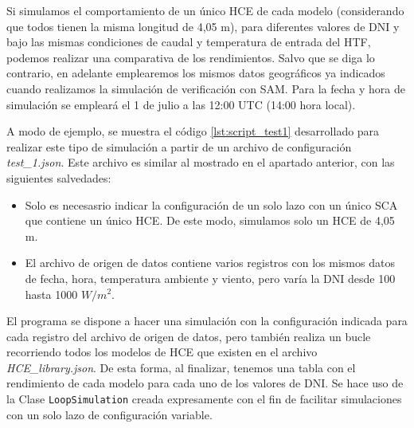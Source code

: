 Si simulamos el comportamiento de un único HCE de cada modelo (considerando que todos tienen la misma longitud de 4,05 m),  para  diferentes valores de DNI y bajo las mismas condiciones de caudal y temperatura de entrada del HTF, podemos realizar una comparativa de los rendimientos. Salvo que se diga lo contrario, en adelante emplearemos los mismos datos geográficos ya indicados cuando realizamos la simulación de verificación con SAM. Para la fecha y hora de simulación se empleará el 1 de julio a las 12:00 UTC (14:00 hora local).

A modo de ejemplo, se muestra el código  \ref{lst:script_test1} desarrollado para realizar este tipo de simulación a partir de un archivo de configuración \emph{test\_1.json}.  Este archivo es similar al mostrado en el apartado anterior, con las siguientes salvedades:
\begin{itemize}
\item
Solo es necesasrio indicar la configuración de un solo lazo con un único SCA que contiene un único HCE. De este modo, simulamos solo un HCE de 4,05 m.
\item 
El archivo de origen de datos contiene varios registros con los mismos datos de fecha, hora, temperatura ambiente y viento, pero varía la DNI desde 100 hasta 1000 $W/m^2$.
\end{itemize}

El programa se dispone a hacer una simulación con la configuración indicada para cada registro del archivo de origen de datos, pero también realiza un bucle recorriendo todos los modelos de HCE que existen en el archivo \emph{HCE\_library.json}. De esta forma, al finalizar, tenemos una tabla con el rendimiento de cada modelo para cada uno de los valores de DNI. Se hace uso de la Clase \texttt{LoopSimulation} creada expresamente con el fin de facilitar simulaciones con un solo lazo de configuración variable.


